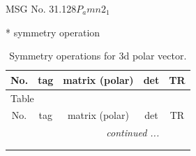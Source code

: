 \documentclass[fleqn,8pt]{jsarticle}
\begin{document}
\setcounter{MaxMatrixCols}{32}

\renewcommand{\tablename}{Table~}
\renewcommand{\figurename}{Figure~}
\begin{center}
\LARGE
MSG No. 31.128\quad$P_{a}mn2_{1}$
\end{center}
* symmetry operation
\renewcommand{\arraystretch}{1.3}
\begin{longtable}{ccccc}
\caption{Symmetry operations for 3d polar vector.}
 \\
 \hline \hline
No. & tag & matrix (polar) & det & TR \\ \hline \endfirsthead

\multicolumn{4}{l}{\tablename\ \thetable{}} \\
 \hline \hline
No. & tag & matrix (polar) & det & TR \\ \hline \endhead

 \hline \hline
\multicolumn{4}{r}{\footnotesize\it continued ...} \\ \endfoot

 \hline \hline
\multicolumn{4}{r}{} \\ \endlastfoot


\end{longtable}
\end{document}
